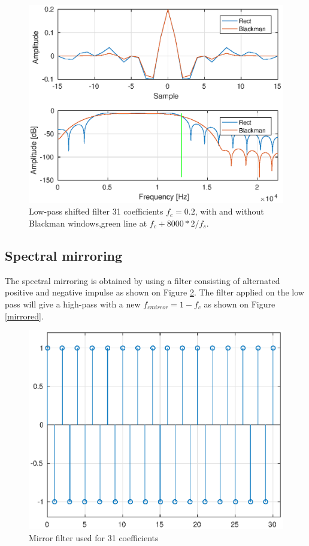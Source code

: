\documentclass[twoside,twocolumn]{article}
\begin{document}
\begin{figure}[h!]
	\centering
	\includegraphics[scale=0.5]{./images/shifted.eps}
	\caption{Low-pass shifted filter 31 coefficients $f_{c}=0.2$, with and without Blackman windows,green line at $f_c+8000*2/f_s$.}
	\label{shifted}
\end{figure}


\subsection{Spectral mirroring}

The spectral mirroring is obtained by using a filter consisting of alternated positive and negative impulse as shown on Figure \ref{mirrorfilt}. The filter applied on the low pass will give a high-pass with a new $f_{cmirror}=1-f_c$ as shown on Figure \ref{mirrored}.
\begin{figure}[h!]
	\centering
	\includegraphics[scale=0.5]{./images/mirrorfilt.eps}
	\caption{Mirror filter used for 31 coefficients}
	\label{mirrorfilt}
\end{figure}
\end{document}
